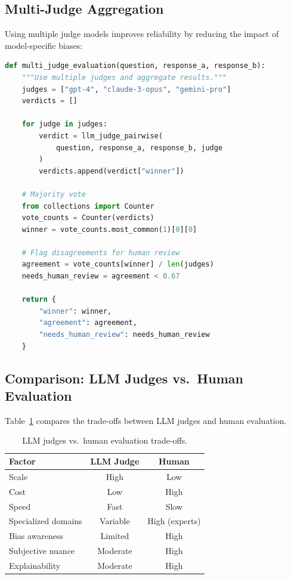 \subsection{Multi-Judge Aggregation}

Using multiple judge models improves reliability by reducing the impact of model-specific biases:

\begin{lstlisting}[basicstyle=\small\ttfamily,language=Python]
def multi_judge_evaluation(question, response_a, response_b):
    """Use multiple judges and aggregate results."""
    judges = ["gpt-4", "claude-3-opus", "gemini-pro"]
    verdicts = []
    
    for judge in judges:
        verdict = llm_judge_pairwise(
            question, response_a, response_b, judge
        )
        verdicts.append(verdict["winner"])
    
    # Majority vote
    from collections import Counter
    vote_counts = Counter(verdicts)
    winner = vote_counts.most_common(1)[0][0]
    
    # Flag disagreements for human review
    agreement = vote_counts[winner] / len(judges)
    needs_human_review = agreement < 0.67
    
    return {
        "winner": winner,
        "agreement": agreement,
        "needs_human_review": needs_human_review
    }
\end{lstlisting}

\subsection{Comparison: LLM Judges vs.\ Human Evaluation}

Table~\ref{tab:llm-vs-human} compares the trade-offs between LLM judges and human evaluation.

\begin{table}[h]
\centering
\caption{LLM judges vs.\ human evaluation trade-offs.}
\label{tab:llm-vs-human}
\begin{tabular}{@{}lcc@{}}
\toprule
\textbf{Factor} & \textbf{LLM Judge} & \textbf{Human} \\
\midrule
Scale               & High       & Low \\
Cost                & Low        & High \\
Speed               & Fast       & Slow \\
Specialized domains & Variable   & High (experts) \\
Bias awareness      & Limited    & High \\
Subjective nuance   & Moderate   & High \\
Explainability      & Moderate   & High \\
\bottomrule
\end{tabular}
\end{table}

